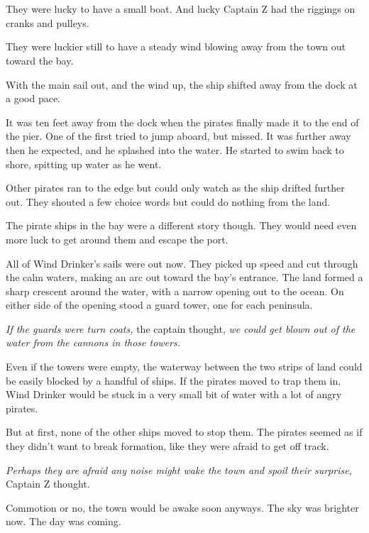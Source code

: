 \documentclass[12pt]{extbook}
\begin{document}
  \section{}\label{section-38}
  
  They were lucky to have a small boat. And lucky Captain Z had the
  riggings on cranks and pulleys.
  
  They were luckier still to have a steady wind blowing away from the town
  out toward the bay.
  
  With the main sail out, and the wind up, the ship shifted away from the
  dock at a good pace.
  
  It was ten feet away from the dock when the pirates finally made it to
  the end of the pier. One of the first tried to jump aboard, but missed.
  It was further away then he expected, and he splashed into the water. He
  started to swim back to shore, spitting up water as he went.
  
  Other pirates ran to the edge but could only watch as the ship drifted
  further out. They shouted a few choice words but could do nothing from
  the land.
  
  The pirate ships in the bay were a different story though. They would
  need even more luck to get around them and escape the port.
  
  All of Wind Drinker's sails were out now. They picked up speed and cut
  through the calm waters, making an arc out toward the bay's entrance.
  The land formed a sharp crescent around the water, with a narrow opening
  out to the ocean. On either side of the opening stood a guard tower, one
  for each peninsula.
  
  \emph{If the guards were turn coats,} the captain thought, \emph{we
  could get blown out of the water from the cannons in those towers.}
  
  Even if the towers were empty, the waterway between the two strips of
  land could be easily blocked by a handful of ships. If the pirates moved
  to trap them in, Wind Drinker would be stuck in a very small bit of
  water with a lot of angry pirates.
  
  But at first, none of the other ships moved to stop them. The pirates
  seemed as if they didn't want to break formation, like they were afraid
  to get off track.
  
  \emph{Perhaps they are afraid any noise might wake the town and spoil
  their surprise,} Captain Z thought.
  
  Commotion or no, the town would be awake soon anyways. The sky was
  brighter now. The day was coming.
  
\end{document}
